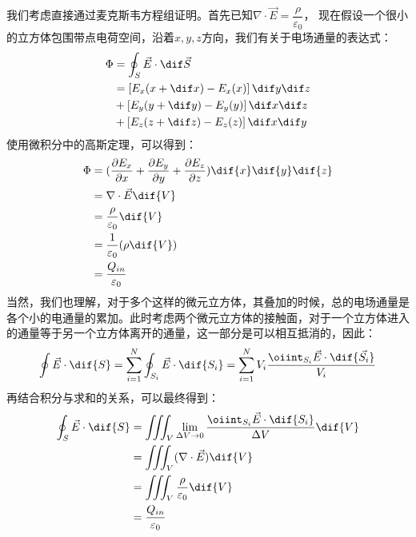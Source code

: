 \chapter[电磁学]{}
\begin{prove}
    我们考虑直接通过麦克斯韦方程组证明。首先已知$\nabla \cdot \vec{E} = \dfrac{\rho}{\varepsilon_0}$，
    现在假设一个很小的立方体包围带点电荷空间，沿着$x,y,z$方向，我们有关于电场通量的表达式：
    \begin{align*}
        \Phi &= \oint_S \vec{E} \cdot \dif \vec{S} \\
        &= \left[E_x(x + \dif x) - E_x(x)\right] \dif y \dif z \\
        &+ \left[E_y(y + \dif y) - E_y(y)\right] \dif x \dif z \\
        &+ \left[E_z(z + \dif z) - E_z(z)\right] \dif x \dif y
    \end{align*}
    使用微积分中的高斯定理，可以得到：
    \begin{align*}
        \Phi &= (\dfrac{\partial E_x}{\partial x} + \dfrac{\partial E_y}{\partial y} + \dfrac{\partial E_z}{\partial z})\dif{x}\dif{y}\dif{z} \\
        &= \nabla \cdot \vec{E} \dif{V}\\
        &= \dfrac{\rho}{\varepsilon_0} \dif{V}\\
        &= \dfrac{1}{\varepsilon_0}(\rho \dif{V})\\
        &= \dfrac{Q_{in}}{\varepsilon_0}
    \end{align*}
    当然，我们也理解，对于多个这样的微元立方体，其叠加的时候，总的电场通量是各个小的电通量的累加。此时考虑两个微元立方体的接触面，对于一个立方体进入的通量等于另一个立方体离开的通量，这一部分是可以相互抵消的，因此：
    \[\oint\vec{E}\cdot\dif{S} = \sum_{i = 1}^{N} \oint_{S_i}\vec{E}\cdot\dif{S_i} = \sum_{i=1}^{N}V_i \dfrac{\oiint_{S_i}\vec{E}\cdot\dif{\vec{S_i}}}{V_i}\]
    再结合积分与求和的关系，可以最终得到：
    \begin{align*}
        \oint_S\vec{E}\cdot\dif{S} &= \iiint_V\lim_{\Delta V\rightarrow 0}\dfrac{\oiint_{S_i}\vec{E}\cdot\dif{S_i}}{\Delta V}\dif{V}\\
        &= \iiint_V (\nabla\cdot\vec{E})\dif{V}\\
        &= \iiint_V \dfrac{\rho}{\varepsilon_0}\dif{V}\\
        &= \dfrac{Q_{in}}{\varepsilon_0}
    \end{align*}
\end{prove}

